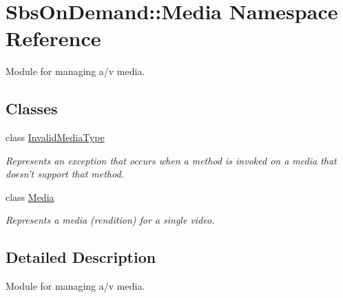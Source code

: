 \hypertarget{namespace_sbs_on_demand_1_1_media}{
\section{\-Sbs\-On\-Demand\-:\-:\-Media \-Namespace \-Reference}
\label{namespace_sbs_on_demand_1_1_media}
}


\-Module for managing a/v media.  


\subsection*{\-Classes}
\begin{DoxyCompactItemize}
\item 
class \hyperlink{class_sbs_on_demand_1_1_media_1_1_invalid_media_type}{\-Invalid\-Media\-Type}
\begin{DoxyCompactList}\small\item\em \-Represents an exception that occurs when a method is invoked on a media that doesn't support that method. \end{DoxyCompactList}\item 
class \hyperlink{class_sbs_on_demand_1_1_media_1_1_media}{\-Media}
\begin{DoxyCompactList}\small\item\em \-Represents a media (rendition) for a single video. \end{DoxyCompactList}\end{DoxyCompactItemize}


\subsection{\-Detailed \-Description}
\-Module for managing a/v media. 